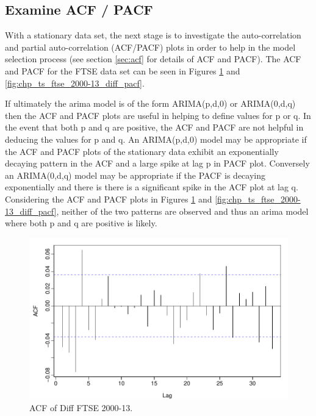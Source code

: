 \subsection{Examine ACF / PACF}
With a stationary data set, the next stage is to investigate the auto-correlation and partial auto-correlation (ACF/PACF) plots in order to help in the model selection process (see section \ref{sec:acf} for details of ACF and PACF). The ACF and PACF for the FTSE data set can be seen in Figures \ref{fig:chp_ts_ftse_2000-13_diff_acf} and \ref{fig:chp_ts_ftse_2000-13_diff_pacf}. 

If ultimately the arima model is of the form ARIMA(p,d,0) or ARIMA(0,d,q) then the ACF and PACF plots are useful in helping to define values for p or q. In the event that both p and q are positive, the ACF and PACF are not helpful in deducing the values for p and q. An ARIMA(p,d,0) model may be appropriate if the ACF and PACF plots of the stationary data exhibit an exponentially decaying pattern in the ACF and a large spike at lag p in PACF plot. Conversely an ARIMA(0,d,q) model may be appropriate if the PACF is decaying exponentially and there is there is a significant spike in the ACF plot at lag q. Considering the ACF and PACF plots in Figures \ref{fig:chp_ts_ftse_2000-13_diff_acf} and \ref{fig:chp_ts_ftse_2000-13_diff_pacf}, neither of the two patterns are observed and thus an arima model where both p and q are positive is likely.

\begin{figure}[tbh]
\centering
\includegraphics{Figures/chp_ts_ftse_2000-13_diff_acf}
\caption[FTSE 2000-13 Diff.]{ACF of Diff FTSE 2000-13.}
\label{fig:chp_ts_ftse_2000-13_diff_acf}
\end{figure}

